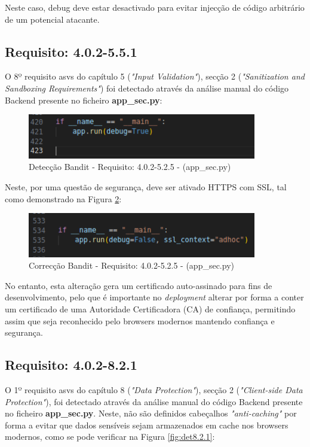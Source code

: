 Neste caso, debug deve estar desactivado para evitar injecção de código arbitrário de um potencial atacante.

\subsection*{Requisito: 4.0.2-5.5.1}

O 8º requisito \ac{asvs} do capítulo 5 (\textit{"Input Validation"}), secção 2  (\textit{"Sanitization and Sandboxing Requirements"}) foi detectado através da análise manual do código Backend presente no ficheiro \textbf{app\_sec.py}:

\begin{figure}[H]
      \centering
      \includegraphics[width=10cm]{images/detdebug.png}
      \caption{Detecção Bandit - Requisito: 4.0.2-5.2.5 - (app\_sec.py)}
      \label{fig:det5.5.1}
\end{figure}

Neste, por uma questão de segurança, deve ser ativado HTTPS com SSL, tal como demonstrado na Figura \ref{fig:cor5.5.1}:

\begin{figure}[H]
      \centering
      \includegraphics[width=10cm]{images/cordebug.png}
      \caption{Correcção Bandit - Requisito: 4.0.2-5.2.5 - (app\_sec.py)}
      \label{fig:cor5.5.1}
\end{figure}

No entanto, esta alteração gera um certificado auto-assinado para fins de desenvolvimento, pelo que é importante no \textit{deployment} alterar por forma a conter um certificado de uma Autoridade Certificadora (CA) de confiança, permitindo assim que seja reconhecido pelo browsers modernos mantendo confiança e segurança. 

\subsection*{Requisito: 4.0.2-8.2.1}
O 1º requisito \ac{asvs} do capítulo 8 (\textit{"Data Protection"}), secção 2 (\textit{"Client-side Data Protection"}), foi detectado através da análise manual do código Backend presente no ficheiro \textbf{app\_sec.py}. Neste, não são definidos cabeçalhos \textit{"anti-caching"} por forma a evitar que dados sensíveis sejam armazenados em cache nos browsers modernos, como se pode verificar na Figura \ref{fig:det8.2.1}:

